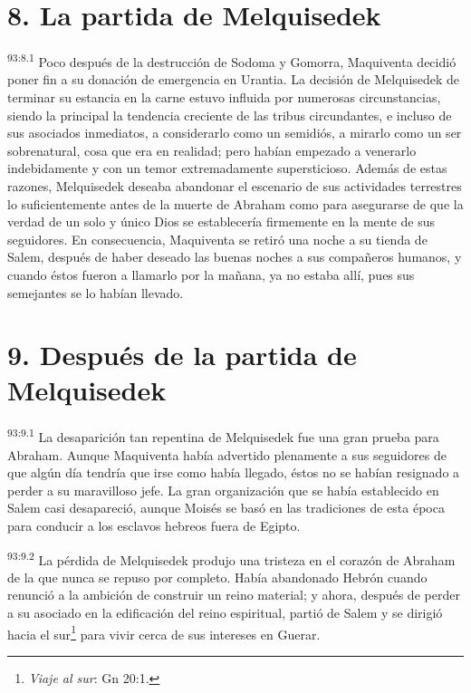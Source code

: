 \section*{8. La partida de Melquisedek}
\par
\textsuperscript{93:8.1} Poco después de la destrucción de Sodoma y Gomorra, Maquiventa decidió poner fin a su donación de emergencia en Urantia. La decisión de Melquisedek de terminar su estancia en la carne estuvo influida por numerosas circunstancias, siendo la principal la tendencia creciente de las tribus circundantes, e incluso de sus asociados inmediatos, a considerarlo como un semidiós, a mirarlo como un ser sobrenatural, cosa que era en realidad; pero habían empezado a venerarlo indebidamente y con un temor extremadamente supersticioso. Además de estas razones, Melquisedek deseaba abandonar el escenario de sus actividades terrestres lo suficientemente antes de la muerte de Abraham como para asegurarse de que la verdad de un solo y único Dios se establecería firmemente en la mente de sus seguidores. En consecuencia, Maquiventa se retiró una noche a su tienda de Salem, después de haber deseado las buenas noches a sus compañeros humanos, y cuando éstos fueron a llamarlo por la mañana, ya no estaba allí, pues sus semejantes se lo habían llevado.

\section*{9. Después de la partida de Melquisedek}
\par
\textsuperscript{93:9.1} La desaparición tan repentina de Melquisedek fue una gran prueba para Abraham. Aunque Maquiventa había advertido plenamente a sus seguidores de que algún día tendría que irse como había llegado, éstos no se habían resignado a perder a su maravilloso jefe. La gran organización que se había establecido en Salem casi desapareció, aunque Moisés se basó en las tradiciones de esta época para conducir a los esclavos hebreos fuera de Egipto.

\par
\textsuperscript{93:9.2} La pérdida de Melquisedek produjo una tristeza en el corazón de Abraham de la que nunca se repuso por completo. Había abandonado Hebrón cuando renunció a la ambición de construir un reino material; y ahora, después de perder a su asociado en la edificación del reino espiritual, partió de Salem y se dirigió hacia el sur\footnote{\textit{Viaje al sur}: Gn 20:1.} para vivir cerca de sus intereses en Guerar.

